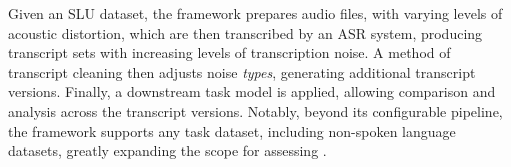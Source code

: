 
Given an SLU dataset, the framework prepares audio files, with varying levels of acoustic distortion, which are then transcribed by an ASR system, producing transcript sets with increasing levels of transcription noise. A method of transcript cleaning then adjusts noise \textit{types}, generating additional transcript versions. Finally, a downstream task model is applied, allowing comparison and analysis across the transcript versions.
Notably, beyond its configurable pipeline, the framework supports any task dataset, including non-spoken language datasets, greatly expanding the scope for assessing \ENDow{}.


